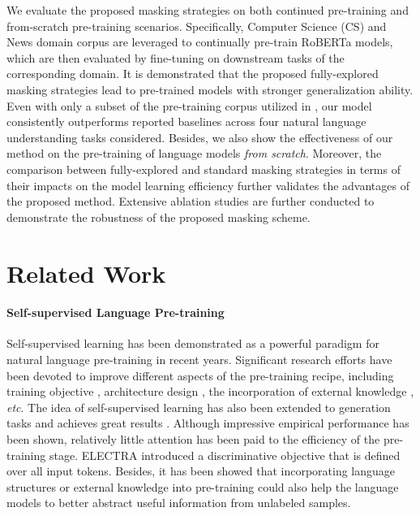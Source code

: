 \documentclass{article} \usepackage{iclr2021_conference,times}
\theoremstyle{plain}
\begin{document}
We evaluate the proposed masking strategies on both continued pre-training \citep{gururangan2020don} and from-scratch pre-training scenarios. 
Specifically, Computer Science (CS) and News domain corpus \citep{gururangan2020don} are leveraged to continually pre-train RoBERTa models, which are then evaluated by fine-tuning on downstream tasks of the corresponding domain. 
It is demonstrated that the proposed fully-explored masking strategies lead to pre-trained models with stronger generalization ability. 
Even with only a subset of the pre-training corpus utilized in \citep{gururangan2020don}, our model consistently outperforms reported baselines across four natural language understanding tasks considered. 
Besides, we also show the effectiveness of our method on the pre-training of language models \emph{from scratch}. 
Moreover, the comparison between fully-explored and standard masking strategies in terms of their impacts on the model learning efficiency further validates the advantages of the proposed method.
Extensive ablation studies are further conducted to demonstrate the robustness of the proposed masking scheme.

\vspace{-3mm}
\section{Related Work}
\vspace{-2mm}
\paragraph{Self-supervised Language Pre-training} 
Self-supervised learning has been demonstrated as a powerful paradigm for natural language pre-training in recent years. Significant research efforts have been devoted to improve different aspects of the pre-training recipe, including training objective \citep{lewis2019bart, clark2019electra, bao2020unilmv2, liu2019roberta}, architecture design \citep{yang2019xlnet, he2020deberta}, the incorporation of external knowledge \citep{sun2019ernie, Zhang2019ERNIEEL}, \emph{etc}. The idea of self-supervised learning has also been extended to generation tasks and achieves great results \citep{Song2019MASSMS, dong2019unified}. 
Although impressive empirical performance has been shown, relatively little attention has been paid to the efficiency of the pre-training stage. ELECTRA \citep{clark2019electra} introduced a discriminative objective that is defined over all input tokens. Besides, it has been showed that incorporating language structures \citep{wang2019structbert} or external knowledge \citep{sun2019ernie, Zhang2019ERNIEEL} into pre-training could also help the language models to better abstract useful information from unlabeled samples. 
\end{document}
